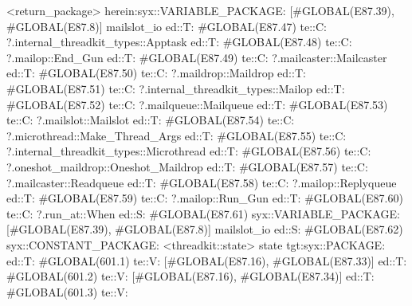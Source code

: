                                                          <return_package>
                                            herein:syx::VARIABLE_PACKAGE:
                                             [#GLOBAL(E87.39), #GLOBAL(E87.8)]
                                     mailslot_io
                    ed::T: #GLOBAL(E87.47)
                     te::C:
                     ?.internal_threadkit_types::Apptask
                    ed::T: #GLOBAL(E87.48)
                     te::C:
                     ?.mailop::End_Gun
                    ed::T: #GLOBAL(E87.49)
                     te::C:
                     ?.mailcaster::Mailcaster
                    ed::T: #GLOBAL(E87.50)
                     te::C:
                     ?.maildrop::Maildrop
                    ed::T: #GLOBAL(E87.51)
                     te::C:
                     ?.internal_threadkit_types::Mailop
                    ed::T: #GLOBAL(E87.52)
                     te::C:
                     ?.mailqueue::Mailqueue
                    ed::T: #GLOBAL(E87.53)
                     te::C:
                     ?.mailslot::Mailslot
                    ed::T: #GLOBAL(E87.54)
                     te::C:
                     ?.microthread::Make_Thread_Args
                    ed::T: #GLOBAL(E87.55)
                     te::C:
                     ?.internal_threadkit_types::Microthread
                    ed::T: #GLOBAL(E87.56)
                     te::C:
                     ?.oneshot_maildrop::Oneshot_Maildrop
                    ed::T: #GLOBAL(E87.57)
                     te::C:
                     ?.mailcaster::Readqueue
                    ed::T: #GLOBAL(E87.58)
                     te::C:
                     ?.mailop::Replyqueue
                    ed::T: #GLOBAL(E87.59)
                     te::C:
                     ?.mailop::Run_Gun
                    ed::T: #GLOBAL(E87.60)
                     te::C:
                     ?.run_at::When
                    ed::S: #GLOBAL(E87.61)
                     syx::VARIABLE_PACKAGE:
                     [#GLOBAL(E87.39), #GLOBAL(E87.8)]
                     mailslot_io
                    ed::S: #GLOBAL(E87.62)
                     syx::CONSTANT_PACKAGE:
                     <threadkit::state>
                     state
                tgt:syx::PACKAGE:
                    ed::T: #GLOBAL(601.1)
                     te::V:
                     [#GLOBAL(E87.16), #GLOBAL(E87.33)]
                    ed::T: #GLOBAL(601.2)
                     te::V:
                     [#GLOBAL(E87.16), #GLOBAL(E87.34)]
                    ed::T: #GLOBAL(601.3)
                     te::V:
